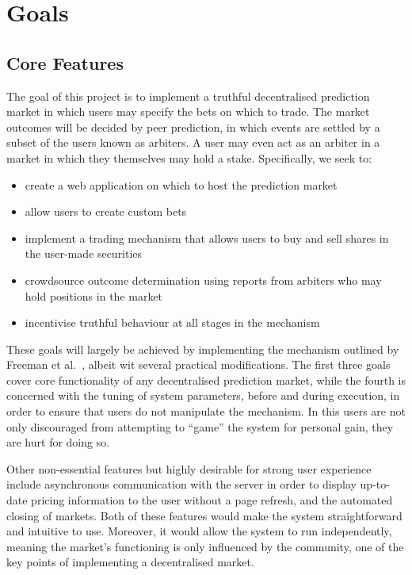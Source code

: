 \section{Goals}

\label{sec:goals}

\subsection{Core Features}

The goal of this project is to implement a truthful decentralised prediction
market in which users may specify the bets on which to trade. The market
outcomes will be decided by peer prediction, in which events are settled by a
subset of the users known as arbiters. A user may even act as an arbiter in a
market in which they themselves may hold a stake. Specifically, we seek to:

\begin{itemize}
	\item create a web application on which to host the prediction market
	\item allow users to create custom bets
	\item implement a trading mechanism that allows users to buy and sell
		shares in the user-made securities
	\item crowdsource outcome determination using reports from arbiters who may
		hold positions in the market
	\item incentivise truthful behaviour at all stages in the mechanism
\end{itemize}

These goals will largely be achieved by implementing the mechanism outlined by
Freeman et al.~\cite{Freeman2017}, albeit wit several practical modifications.
The first three goals cover core functionality of any decentralised prediction
market, while the fourth is concerned with the tuning of system parameters,
before and during execution, in order to ensure that users do not manipulate
the mechanism. In this users are not only discouraged from attempting to
``game'' the system for personal gain, they are hurt for doing so.

Other non-essential features but highly desirable for strong user experience
include asynchronous communication with the server in order to display
up-to-date pricing information to the user without a page refresh, and the
automated closing of markets. Both of these features would make the system
straightforward and intuitive to use. Moreover, it would allow the system to
run independently, meaning the market's functioning is only influenced by the
community, one of the key points of implementing a decentralised market.

